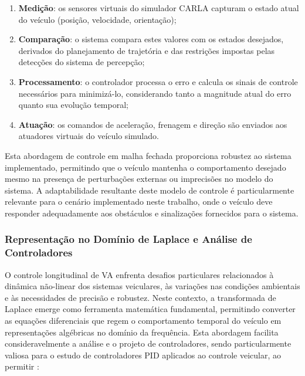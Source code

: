 \begin{enumerate}
    \item \textbf{Medição}: os sensores virtuais do simulador CARLA capturam o estado atual do veículo (posição, velocidade, orientação);
    
    \item \textbf{Comparação}: o sistema compara estes valores com os estados desejados, derivados do planejamento de trajetória e das restrições impostas pelas detecções do sistema de percepção;
    
    \item \textbf{Processamento}: o controlador processa o erro e calcula os sinais de controle necessários para minimizá-lo, considerando tanto a magnitude atual do erro quanto sua evolução temporal;
    
    \item \textbf{Atuação}: os comandos de aceleração, frenagem e direção são enviados aos atuadores virtuais do veículo simulado.
\end{enumerate}

Esta abordagem de controle em malha fechada proporciona robustez ao sistema implementado, permitindo que o veículo mantenha o comportamento desejado mesmo na presença de perturbações externas ou imprecisões no modelo do sistema. A adaptabilidade resultante deste modelo de controle é particularmente relevante para o cenário implementado neste trabalho, onde o veículo deve responder adequadamente aos obstáculos e sinalizações fornecidos para o sistema.

\subsubsection{Representação no Domínio de Laplace e Análise de Controladores} \label{subsubsec:dominio_laplace}

O controle longitudinal de VA enfrenta desafios particulares relacionados à dinâmica não-linear dos sistemas veiculares, às variações nas condições ambientais e às necessidades de precisão e robustez. Neste contexto, a transformada de Laplace emerge como ferramenta matemática fundamental, permitindo converter as equações diferenciais que regem o comportamento temporal do veículo em representações algébricas no domínio da frequência. Esta abordagem facilita consideravelmente a análise e o projeto de controladores, sendo particularmente valiosa para o estudo de controladores PID aplicados ao controle veicular, ao permitir \cite{University_of_Toronto2018-fe}:

